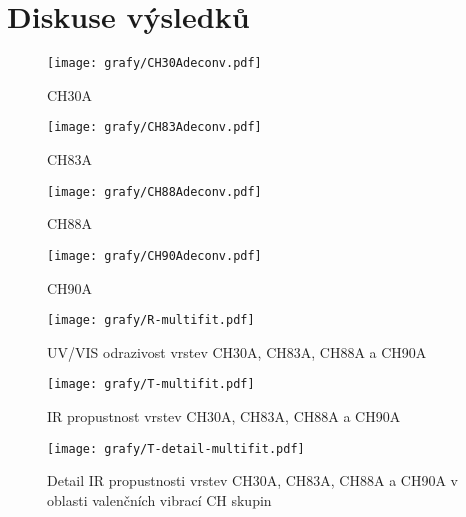 \chapter{Diskuse výsledků}

\begin{figure}[ht]
	\begin{minipage}[h]{0.49\linewidth}
		\centering
		\texttt{[image: grafy/CH30Adeconv.pdf]}
		\caption{CH30A}
		\label{fig:water}
	\end{minipage}
	\begin{minipage}[h]{0.49\linewidth}
		\centering
		\texttt{[image: grafy/CH83Adeconv.pdf]}
		\caption{CH83A}
		\label{fig:eg}
	\end{minipage}

	\begin{minipage}[h]{0.49\linewidth}
		\centering
		\texttt{[image: grafy/CH88Adeconv.pdf]}
		\caption{CH88A}
		\label{fig:ab}
	\end{minipage}
	\begin{minipage}[h]{0.49\linewidth}
		\centering
		\texttt{[image: grafy/CH90Adeconv.pdf]}
		\caption{CH90A}
		\label{fig:g}
	\end{minipage}
\end{figure}

\begin{figure}[ht]
	\texttt{[image: grafy/R-multifit.pdf]}
	\caption{UV/VIS odrazivost vrstev CH30A, CH83A, CH88A a CH90A}
\end{figure}

\begin{figure}[ht]
	\texttt{[image: grafy/T-multifit.pdf]}
	\caption{IR propustnost vrstev CH30A, CH83A, CH88A a CH90A}
\end{figure}

\begin{figure}[ht]
	\texttt{[image: grafy/T-detail-multifit.pdf]}
	\caption{Detail IR propustnosti vrstev CH30A, CH83A, CH88A a CH90A v oblasti valenčních vibrací CH skupin}
\end{figure}

\cleardoublepage
